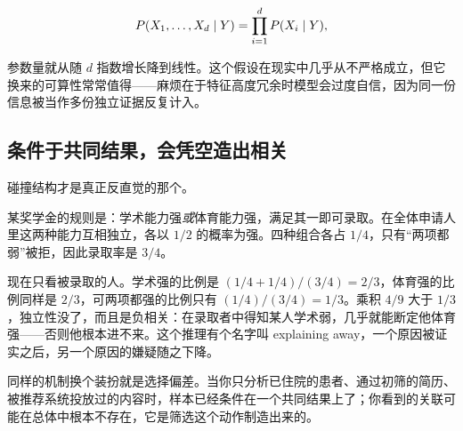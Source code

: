 \[
P(X_1,\dots,X_d\mid Y)=\prod_{i=1}^{d}P(X_i\mid Y),
\]

参数量就从随 \(d\) 指数增长降到线性。这个假设在现实中几乎从不严格成立，但它换来的可算性常常值得——麻烦在于特征高度冗余时模型会过度自信，因为同一份信息被当作多份独立证据反复计入。

\subsection{条件于共同结果，会凭空造出相关}

碰撞结构才是真正反直觉的那个。

某奖学金的规则是：学术能力强\emph{或}体育能力强，满足其一即可录取。在全体申请人里这两种能力互相独立，各以 \(1/2\) 的概率为强。四种组合各占 \(1/4\)，只有``两项都弱''被拒，因此录取率是 \(3/4\)。

现在只看被录取的人。学术强的比例是 \((1/4+1/4)/(3/4)=2/3\)，体育强的比例同样是 \(2/3\)，可两项都强的比例只有 \((1/4)/(3/4)=1/3\)。乘积 \(4/9\) 大于 \(1/3\)，独立性没了，而且是负相关：在录取者中得知某人学术弱，几乎就能断定他体育强——否则他根本进不来。这个推理有个名字叫 explaining away，一个原因被证实之后，另一个原因的嫌疑随之下降。

同样的机制换个装扮就是选择偏差。当你只分析已住院的患者、通过初筛的简历、被推荐系统投放过的内容时，样本已经条件在一个共同结果上了；你看到的关联可能在总体中根本不存在，它是筛选这个动作制造出来的。

